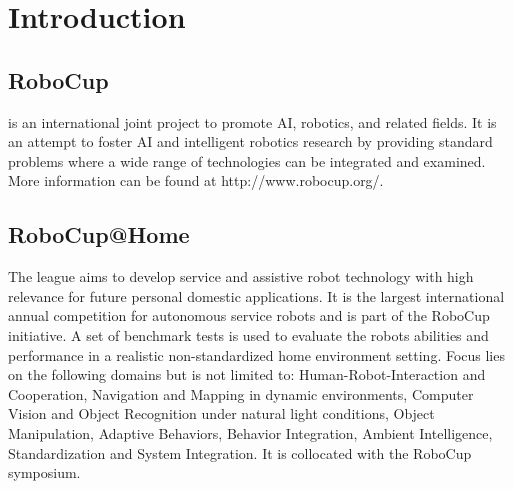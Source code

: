 \chapter{Introduction}
\label{chap:introduction}


\section{RoboCup}
 is an international joint project to promote AI, robotics, and related fields. It is an attempt to foster AI and intelligent robotics research by providing standard problems where a wide range of technologies can be integrated and examined. More information can be found at http://www.robocup.org/.

\section{RoboCup@Home}
The  league aims to develop service and assistive robot technology with high relevance for future personal domestic applications. It is the largest international annual competition for autonomous service robots and is part of the RoboCup initiative. A set of benchmark tests is used to evaluate the robots abilities and performance in a realistic non-standardized home environment setting. Focus lies on the following domains but is not limited to: Human-Robot-Interaction and Cooperation, Navigation and Mapping in dynamic environments, Computer Vision and Object Recognition under natural light conditions, Object Manipulation, Adaptive Behaviors, Behavior Integration, Ambient Intelligence, Standardization and System Integration. It is collocated with the RoboCup symposium.











